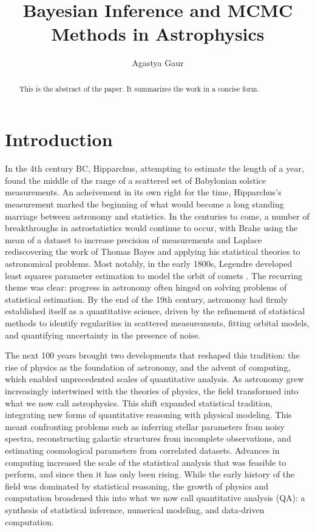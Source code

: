 \documentclass[manuscript,linenumbers,longauthor]{aastex631}
\begin{document}
\label{placeholder} %

\title{Bayesian Inference and MCMC Methods in Astrophysics}
\author{Agastya Gaur}

\begin{abstract}
  This is the abstract of the paper. It summarizes the work in a concise form.
\end{abstract}

\tableofcontents

\section{Introduction}
\label{sec:Introduction}
In the 4th century BC, Hipparchus, attempting to estimate the length of a year, found the middle of the range of a scattered set of Babylonian solstice measurements. An acheivement in its own right for the time, Hipparchus's measurement marked the beginning of what would become a long standing marriage between astronomy and statistics. In the centuries to come, a number of breakthroughs in astrostatistics would continue to occur, with Brahe using the mean of a dataset to increase precision of measurements and Laplace rediscovering the work of Thomas Bayes and applying his statistical theories to astronomical problems. Most notably, in the early 1800s, Legendre developed least squares parameter estimation to model the orbit of comets \citep{feigelsonStatisticalChallengesModern2004}. The recurring theme was clear: progress in astronomy often hinged on solving problems of statistical estimation. By the end of the 19th century, astronomy had firmly established itself as a quantitative science, driven by the refinement of statistical methods to identify regularities in scattered measurements, fitting orbital models, and quantifying uncertainty in the presence of noise.

The next 100 years brought two developments that reshaped this tradition: the rise of physics as the foundation of astronomy, and the advent of computing, which enabled unprecedented scales of quantitative analysis. As astronomy grew increasingly intertwined with the theories of physics, the field transformed into what we now call astrophysics. This shift expanded statistical tradition, integrating new forms of quantitative reasoning with physical modeling. This meant confronting problems such as inferring stellar parameters from noisy spectra, reconstructing galactic structures from incomplete observations, and estimating cosmological parameters from correlated datasets. Advances in computing increased the scale of the statistical analysis that was feasible to perform, and since then it has only been rising. While the early history of the field was dominated by statistical reasoning, the growth of physics and computation broadened this into what we now call quantitative analysis (QA): a synthesis of statistical inference, numerical modeling, and data-driven computation.
\end{document}
